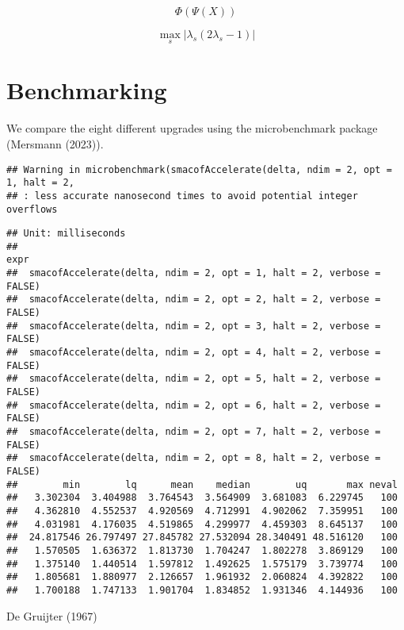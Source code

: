 \documentclass[
  12pt,
]{article}
\begin{document}
\begin{equation}
\Phi(\Psi(X))
\end{equation}

\begin{equation}
\max_s|\lambda_s(2\lambda_s-1)|
\end{equation}

\section{Benchmarking}\label{benchmarking}

We compare the eight different upgrades using the microbenchmark package (Mersmann (2023)).

\begin{verbatim}
## Warning in microbenchmark(smacofAccelerate(delta, ndim = 2, opt = 1, halt = 2,
## : less accurate nanosecond times to avoid potential integer overflows
\end{verbatim}

\begin{verbatim}
## Unit: milliseconds
##                                                                   expr
##  smacofAccelerate(delta, ndim = 2, opt = 1, halt = 2, verbose = FALSE)
##  smacofAccelerate(delta, ndim = 2, opt = 2, halt = 2, verbose = FALSE)
##  smacofAccelerate(delta, ndim = 2, opt = 3, halt = 2, verbose = FALSE)
##  smacofAccelerate(delta, ndim = 2, opt = 4, halt = 2, verbose = FALSE)
##  smacofAccelerate(delta, ndim = 2, opt = 5, halt = 2, verbose = FALSE)
##  smacofAccelerate(delta, ndim = 2, opt = 6, halt = 2, verbose = FALSE)
##  smacofAccelerate(delta, ndim = 2, opt = 7, halt = 2, verbose = FALSE)
##  smacofAccelerate(delta, ndim = 2, opt = 8, halt = 2, verbose = FALSE)
##        min        lq      mean    median        uq       max neval
##   3.302304  3.404988  3.764543  3.564909  3.681083  6.229745   100
##   4.362810  4.552537  4.920569  4.712991  4.902062  7.359951   100
##   4.031981  4.176035  4.519865  4.299977  4.459303  8.645137   100
##  24.817546 26.797497 27.845782 27.532094 28.340491 48.516120   100
##   1.570505  1.636372  1.813730  1.704247  1.802278  3.869129   100
##   1.375140  1.440514  1.597812  1.492625  1.575179  3.739774   100
##   1.805681  1.880977  2.126657  1.961932  2.060824  4.392822   100
##   1.700188  1.747133  1.901704  1.834852  1.931346  4.144936   100
\end{verbatim}

De Gruijter (1967)
\end{document}
